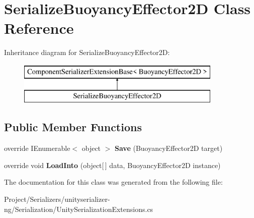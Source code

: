 \hypertarget{class_serialize_buoyancy_effector2_d}{}\section{Serialize\+Buoyancy\+Effector2D Class Reference}
\label{class_serialize_buoyancy_effector2_d}
Inheritance diagram for Serialize\+Buoyancy\+Effector2D\+:\begin{figure}[H]
\begin{center}
\leavevmode
\includegraphics[height=2.000000cm]{class_serialize_buoyancy_effector2_d}
\end{center}
\end{figure}
\subsection*{Public Member Functions}
\begin{DoxyCompactItemize}
\item 
\mbox{\label{class_serialize_buoyancy_effector2_d_ae962d6acb99692dc665c8c87b52bd6c1}} 
override I\+Enumerable$<$ object $>$ {\bfseries Save} (Buoyancy\+Effector2D target)
\item 
\mbox{\label{class_serialize_buoyancy_effector2_d_a62d9b2d56f69620c38994d026c8b479f}} 
override void {\bfseries Load\+Into} (object\mbox{[}$\,$\mbox{]} data, Buoyancy\+Effector2D instance)
\end{DoxyCompactItemize}


The documentation for this class was generated from the following file\+:\begin{DoxyCompactItemize}
\item 
Project/\+Serializers/unityserializer-\/ng/\+Serialization/Unity\+Serialization\+Extensions.\+cs\end{DoxyCompactItemize}
